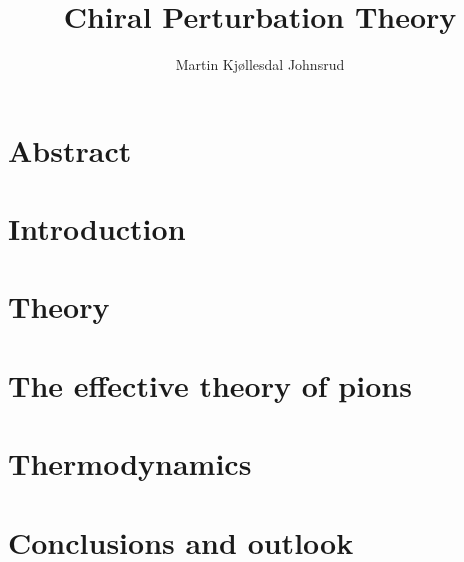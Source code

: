 \documentclass{book}
\title{Chiral Perturbation Theory}
\author{Martin Kjøllesdal Johnsrud}
\begin{document}
\maketitle 

\tableofcontents

\chapter*{Abstract}


\chapter{Introduction}



\chapter{Theory}
\label{chapter:theory}






\chapter{The effective theory of pions}
\label{chapter:effective theory of pions}









\chapter{Thermodynamics}
\label{chapter:thermodynamics}






\chapter{Conclusions and outlook}
\label{chpater:conclusion and outlook}
\end{document}
